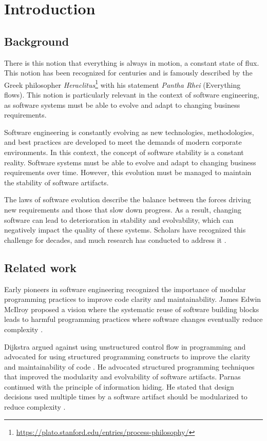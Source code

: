\chapter{Introduction} \label{chap:introduction}

\section{Background} \label{sec:background} 

There is this notion that everything is always in motion, a constant state of flux. This
notion has been recognized for centuries and is famously described by the Greek
philosopher
\emph{Heraclitus}\footnote{\url{https://plato.stanford.edu/entries/process-philosophy/}}
with his statement \emph{Pantha Rhei} (Everything flows). This notion is particularly
relevant in the context of software engineering, as software systems must be able to
evolve and adapt to changing business requirements.

Software engineering is constantly evolving as new technologies, methodologies, and best
practices are developed to meet the demands of modern corporate environments. In this
context, the concept of software stability is a constant reality. Software systems must be
able to evolve and adapt to changing business requirements over time. However, this
evolution must be managed to maintain the stability of software artifacts.

The laws of software evolution describe the balance between the forces driving new
requirements and those that slow down progress. As a result, changing software can lead to
deterioration in stability and evolvability, which can negatively impact the quality of
these systems. Scholars have recognized this challenge for decades, and much research has
conducted to address it \parencite{lehman_programs_1980}.

\section{Related work} \label{sub:related_work}

Early pioneers in software engineering recognized the importance of modular programming
practices to improve code clarity and maintainability. James Edwin McIlroy proposed a
vision where the systematic reuse of software building blocks leads to harmful programming
practices where software changes eventually reduce complexity
\parencite{p_naur_nato_1968}. 

Dijkstra argued against using unstructured control flow in programming and advocated for
using structured programming constructs to improve the clarity and maintainability of code
\parencite{dijkstra_letters_1968}. He advocated structured programming techniques that
improved the modularity and evolvability of software artifacts. Parnas continued with the
principle of information hiding. He stated that design decisions used multiple
times by a software artifact should be modularized to reduce complexity
\parencite{parnas_criteria_1972}. 

